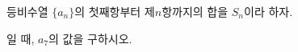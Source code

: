 등비수열 $\{a_n\}$의 첫째항부터 제$n$항까지의 합을 $S_n$이라 하자. \par\smallskip{}\par\smallskip\noindent 일 때, $a_7$의 값을 구하시오.
